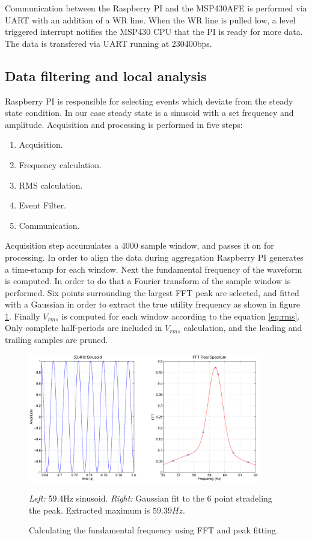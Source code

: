 Communication between the Raspberry PI and the MSP430AFE is performed via UART with an addition of a WR line. When the WR line is pulled low, a level triggered interrupt notifies the MSP430 CPU that the PI is ready for more data. The data is transfered via UART running at 230400bps.

\subsection{Data filtering and local analysis}

Raspberry PI is responsible for selecting events which deviate from the steady state condition. In our case steady state is a sinusoid with a set frequency and amplitude. Acquisition and processing is performed in five steps:

\begin{enumerate}
\item Acquisition.
\item Frequency calculation.
\item RMS calculation.
\item Event Filter.
\item Communication.
\end{enumerate}

Acquisition step accumulates a 4000 sample window, and passes it on for processing. In order to align the data during aggregation Raspberry PI generates a time-stamp for each window. Next the fundamental frequency of the waveform is computed. In order to do that a Fourier transform of the sample window is performed. Six points surrounding the largest FFT peak are selected, and fitted with a Gaussian in order to extract the true utility frequency as shown in figure \ref{fig:fit}. Finally  $V_{rms}$ is computed for each window according to the equation \ref{eq:rms}.  Only complete half-periods are included in $V_{rms}$ calculation, and the leading and trailing samples are pruned. 

\begin{figure}[h!]
\begin{center}
\label{fig:fit}
\includegraphics[width=0.9\textwidth]{img/fftFit.eps}
\end{center}
\caption{Calculating the fundamental frequency using FFT and peak fitting.}
\begin{center}
\textit{Left:} 59.4Hz sinusoid. \textit{Right:} Gaussian fit to the 6 point stradeling the peak. Extracted maximum is $59.39Hz$.
\end{center}
\end{figure}


